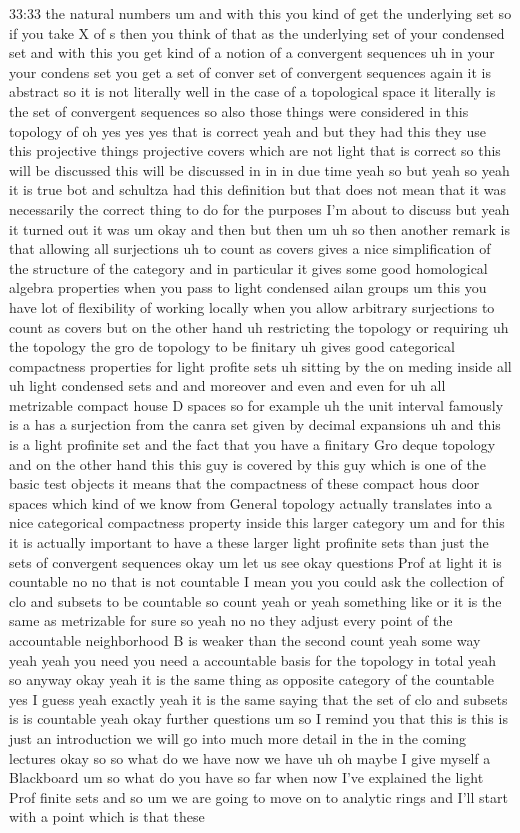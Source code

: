 \begin{unfinished}{33:33}
the natural numbers um and with this you kind of get the underlying set so if you take X of s then you think of that as the underlying set of your condensed set and with this you get kind of a notion of a convergent sequences uh in your your condens set you get a set of conver set of convergent sequences again it is abstract so it is not literally well in the case of a topological space it literally is the set of convergent sequences so also those things were considered in this topology of oh yes yes yes that is correct yeah and but they had this they use this projective things projective covers which are not light that is correct so this will be discussed this will be discussed in in in due time yeah so but yeah so yeah it is true bot and schultza had this definition but that does not mean that it was necessarily the correct thing to do for the purposes I'm about to discuss but yeah it turned out it was um okay and then but then um uh so then another remark is that allowing all surjections uh to count as covers gives a nice simplification of the structure of the category and in particular it gives some good homological algebra properties when you pass to light condensed ailan groups um this you have lot of flexibility of working locally when you allow arbitrary surjections to count as covers but on the other hand uh restricting the topology or requiring uh the topology the gro de topology to be finitary uh gives good categorical compactness properties for light profite sets uh sitting by the on meding inside all uh light condensed sets and and moreover and even and even for uh all metrizable compact house D spaces so for example uh the unit interval famously is a has a surjection from the canra set given by decimal expansions uh and this is a light profinite set and the fact that you have a finitary Gro deque topology and on the other hand this this guy is covered by this guy which is one of the basic test objects it means that the compactness of these compact hous door spaces which kind of we know from General topology actually translates into a nice categorical compactness property inside this larger category um and for this it is actually important to have a these larger light profinite sets than just the sets of convergent sequences okay um let us see okay questions Prof at light it is countable no no that is not countable I mean you you could ask the collection of clo and subsets to be countable so count yeah or yeah something like or it is the same as metrizable for sure so yeah no no they adjust every point of the accountable neighborhood B is weaker than the second count yeah some way yeah yeah you need you need a accountable basis for the topology in total yeah so anyway okay yeah it is the same thing as opposite category of the countable yes I guess yeah exactly yeah it is the same saying that the set of clo and subsets is is countable yeah okay further questions um so I remind you that this is this is just an introduction we will go into much more detail in the in the coming lectures okay so so what do we have now we have uh oh maybe I give myself a Blackboard um so what do you have so far when now I've explained the light Prof finite sets and so um we are going to move on to analytic rings and I'll start with a point which is that these 
\end{unfinished}
